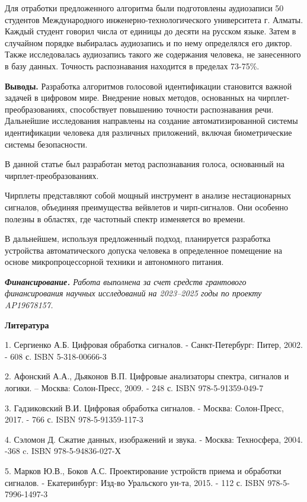 Для отработки предложенного алгоритма были подготовлены аудиозаписи 50
студентов Международного инженерно-технологического университета г.
Алматы. Каждый студент говорил числа от единицы до десяти на русском
языке. Затем в случайном порядке выбиралась аудиозапись и по нему
определялся его диктор. Также исследовалась аудиозапись такого же
содержания человека, не занесенного в базу данных. Точность
распознавания находится в пределах 73-75\%.

{\bfseries Выводы.} Разработка алгоритмов голосовой идентификации
становится важной задачей в цифровом мире. Внедрение новых методов,
основанных на чирплет-преобразованиях, способствует повышению точности
распознавания речи. Дальнейшие исследования направлены на создание
автоматизированной системы идентификации человека для различных
приложений, включая биометрические системы безопасности.

В данной статье был разработан метод распознавания голоса, основанный на
чирплет-преобразованиях.

Чирплеты представляют собой мощный инструмент в анализе нестационарных
сигналов, объединяя преимущества вейвлетов и чирп-сигналов. Они особенно
полезны в областях, где частотный спектр изменяется во времени.

В дальнейшем, используя предложенный подход, планируется разработка
устройства автоматического допуска человека в определенное помещение на
основе микропроцессорной техники и автономного питания.

\emph{{\bfseries Финансирование.} Работа выполнена за счет средств
грантового финансирования научных исследований на 2023--2025 годы по
проекту AP19678157.}

{\bfseries Литература}

1. Сергиенко А.Б. Цифровая обработка сигналов. - Санкт-Петербург: Питер,
2002. - 608 с. ISBN 5-318-00666-3

2. Афонский А.А., Дьяконов В.П. Цифровые анализаторы спектра, сигналов и
логики. -- Москва: Солон-Пресс, 2009. - 248 с. ISBN 978-5-91359-049-7

3. Гадзиковский В.И. Цифровая обработка сигналов. - Москва: Солон-Пресс,
2017. - 766 с. ISBN 978-5-91359-117-3

4. Сэломон Д. Сжатие данных, изображений и звука. - Москва: Техносфера,
2004. -368 c. ISBN 978-5-94836-027-Х

5. Марков Ю.В., Боков А.С. Проектирование устройств приема и обработки
сигналов. - Екатеринбург: Изд-во Уральского ун-та, 2015. - 112 с. ISBN
978-5-7996-1497-3

